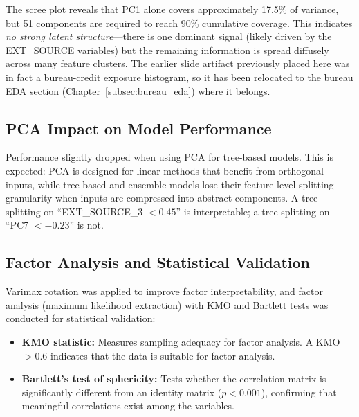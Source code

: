 
The scree plot reveals that PC1 alone covers approximately 17.5\% of variance, but 51 components are required to reach 90\% cumulative coverage. This indicates \textit{no strong latent structure}---there is one dominant signal (likely driven by the EXT\_SOURCE variables) but the remaining information is spread diffusely across many feature clusters. The earlier slide artifact previously placed here was in fact a bureau-credit exposure histogram, so it has been relocated to the bureau EDA section (Chapter~\ref{subsec:bureau_eda}) where it belongs.

\subsection{PCA Impact on Model Performance}

Performance slightly dropped when using PCA for tree-based models. This is expected: PCA is designed for linear methods that benefit from orthogonal inputs, while tree-based and ensemble models lose their feature-level splitting granularity when inputs are compressed into abstract components. A tree splitting on ``EXT\_SOURCE\_3 $< 0.45$'' is interpretable; a tree splitting on ``PC7 $< -0.23$'' is not.


\subsection{Factor Analysis and Statistical Validation}

Varimax rotation was applied to improve factor interpretability, and factor analysis (maximum likelihood extraction) with KMO and Bartlett tests was conducted for statistical validation:

\begin{itemize}
    \item \textbf{KMO statistic:} Measures sampling adequacy for factor analysis. A KMO $> 0.6$ indicates that the data is suitable for factor analysis.
    \item \textbf{Bartlett's test of sphericity:} Tests whether the correlation matrix is significantly different from an identity matrix ($p < 0.001$), confirming that meaningful correlations exist among the variables.
\end{itemize}

